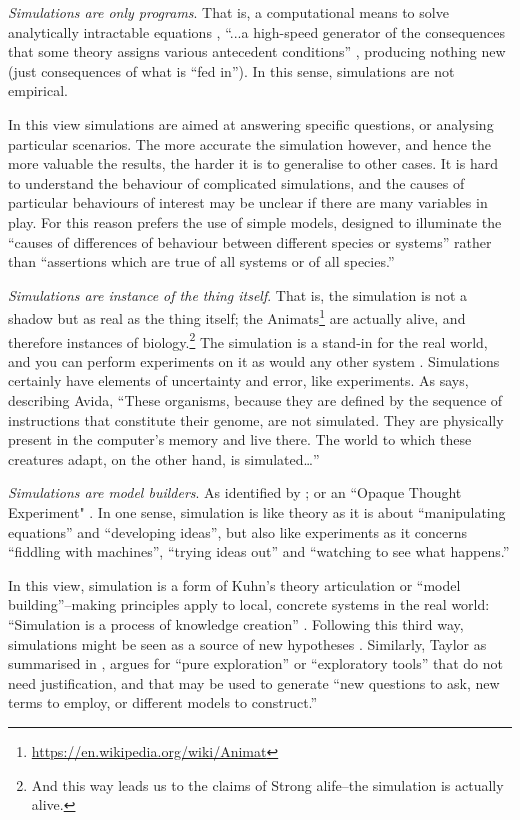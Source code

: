 \emph{Simulations are only programs}. That is, a computational means to solve analytically intractable equations \parencite[31]{Winsberg2010}, ``...a high-speed generator of the consequences that some theory assigns various antecedent conditions'' \parencite[quoting from Dennett]{Eldridge}, producing nothing new (just consequences of what is ``fed in''\parencite{DiPaolo2000}). In this sense, simulations are not empirical.

In this view simulations are aimed at answering specific questions, or analysing particular scenarios. The more accurate the simulation however, and hence the more valuable the results, the harder it is to generalise to other cases. It is hard to understand the behaviour of complicated simulations, and the causes of particular behaviours of interest may be unclear if there are many variables in play. For this reason \textcite{MaynardSmith1974} prefers the use of simple models, designed to illuminate the ``causes of differences of behaviour between different species or systems'' rather than ``assertions which are true of all systems or of all species.''

\emph{Simulations are instance of the thing itself}. That is, the simulation is not a shadow but as real as the thing itself; the Animats\footnote{\url{https://en.wikipedia.org/wiki/Animat}} are actually alive, and therefore instances of biology.\footnote{And this way leads us to the claims of Strong \gls{alife}--the simulation is actually alive.} The simulation is a stand-in for the real world, and you can perform experiments on it as would any other system \parencite[31]{Winsberg2010}. Simulations certainly have elements of uncertainty and error, like experiments. As \textcite{Adami2002} says, describing Avida, ``These organisms, because they are defined by the sequence of instructions that constitute their genome, are not simulated. They are physically present in the computer's memory and live there. The world to which these creatures adapt, on the other hand, is simulated\ldots''

\emph{Simulations are model builders}. As identified by \textcite[p.31]{Winsberg2010}; or an ``Opaque Thought Experiment" \parencite{DiPaolo2000}. In one sense, simulation is like theory as it is about ``manipulating equations'' and ``developing ideas'', but also like experiments as it concerns ``fiddling with machines'', ``trying ideas out'' and ``watching to see what happens.'' \parencite{Winsberg2010}

In this view, simulation is a form of Kuhn's theory articulation or ``model building''--making principles apply to local, concrete systems in the real world: ``Simulation is a process of knowledge creation'' \parencite[6]{Winsberg2010}. Following this third way, simulations might be seen as a source of new hypotheses \parencite{Eldridge}. Similarly, Taylor as summarised in \textcite{Webb2009}, argues for ``pure exploration'' or ``exploratory tools'' that do not need justification, and that may be used to generate ``new questions to ask, new terms to employ, or different models to construct.''

